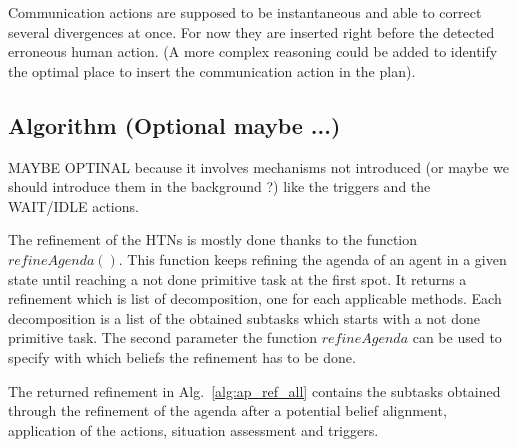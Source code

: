\documentclass[letterpaper]{article} %
\begin{document}
Communication actions are supposed to be instantaneous and able to correct several divergences at once. For now they are inserted right before the detected erroneous human action. (A more complex reasoning could be added to identify the optimal place to insert the communication action in the plan). 



\subsection{Algorithm (Optional maybe ...)}
MAYBE OPTINAL because it involves mechanisms not introduced (or maybe we should introduce them in the background ?) like the triggers and the WAIT/IDLE actions.

The refinement of the HTNs is mostly done thanks to the function $refineAgenda()$. This function keeps refining the agenda of an agent in a given state until reaching a not done primitive task at the first spot. It returns a refinement which is list of decomposition, one for each applicable methods. Each decomposition is a list of the obtained subtasks which starts with a not done primitive task. The second parameter the function $refineAgenda$ can be used to specify with which beliefs the refinement has to be done. 

The returned refinement in Alg.~\ref{alg:ap_ref_all} contains the subtasks obtained through the refinement of the agenda after a potential belief alignment, application of the actions, situation assessment and triggers.
\end{document}
